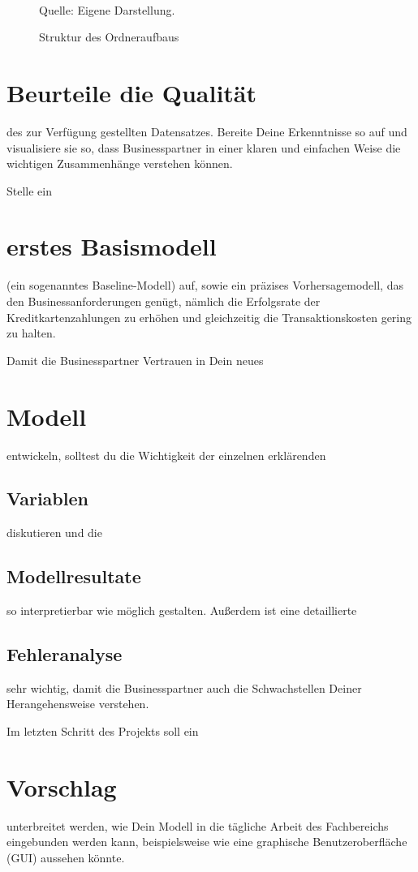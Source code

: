 \begin{figure}[h]
\caption{Struktur des Ordneraufbaus}
\begin{tabular}{c}  %

\end{tabular}\\
\centering
Quelle: Eigene Darstellung.
\label{tab:structure}
\end{figure}





\section{Beurteile die Qualität} des zur Verfügung gestellten Datensatzes. Bereite Deine Erkenntnisse so auf und visualisiere sie so, dass Businesspartner in einer klaren und einfachen Weise die wichtigen Zusammenhänge verstehen können.

Stelle ein \section{erstes Basismodell} (ein sogenanntes Baseline-Modell) auf, sowie ein präzises Vorhersagemodell, das den Businessanforderungen genügt, nämlich die Erfolgsrate der Kreditkartenzahlungen zu erhöhen und gleichzeitig die Transaktionskosten gering zu halten.

Damit die Businesspartner Vertrauen in Dein neues \section{Modell} entwickeln, solltest du die Wichtigkeit der einzelnen erklärenden \subsection{Variablen} diskutieren und die \subsection{Modellresultate} so interpretierbar wie möglich gestalten. Außerdem ist eine detaillierte \subsection{Fehleranalyse} sehr wichtig, damit die Businesspartner auch die Schwachstellen Deiner Herangehensweise verstehen.

Im letzten Schritt des Projekts soll ein \section{Vorschlag} unterbreitet werden, wie Dein Modell in die tägliche Arbeit des Fachbereichs eingebunden werden kann, beispielsweise wie eine graphische Benutzeroberfläche (GUI) aussehen könnte. 

